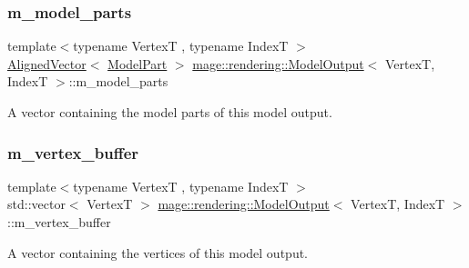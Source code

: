 \subsubsection{\texorpdfstring{m\+\_\+model\+\_\+parts}{m\_model\_parts}}
{\footnotesize\ttfamily template$<$typename VertexT , typename IndexT $>$ \\
\mbox{\hyperlink{namespacemage_a8664bfb5ce2179fc64eae9f82c8a5ba8}{Aligned\+Vector}}$<$ \mbox{\hyperlink{structmage_1_1rendering_1_1_model_part}{Model\+Part}} $>$ \mbox{\hyperlink{structmage_1_1rendering_1_1_model_output}{mage\+::rendering\+::\+Model\+Output}}$<$ VertexT, IndexT $>$\+::m\+\_\+model\+\_\+parts}

A vector containing the model parts of this model output. \mbox{\label{structmage_1_1rendering_1_1_model_output_a397e9daee731bb89683daa68bd4acd0f}} 
\subsubsection{\texorpdfstring{m\+\_\+vertex\+\_\+buffer}{m\_vertex\_buffer}}
{\footnotesize\ttfamily template$<$typename VertexT , typename IndexT $>$ \\
std\+::vector$<$ VertexT $>$ \mbox{\hyperlink{structmage_1_1rendering_1_1_model_output}{mage\+::rendering\+::\+Model\+Output}}$<$ VertexT, IndexT $>$\+::m\+\_\+vertex\+\_\+buffer}

A vector containing the vertices of this model output. 